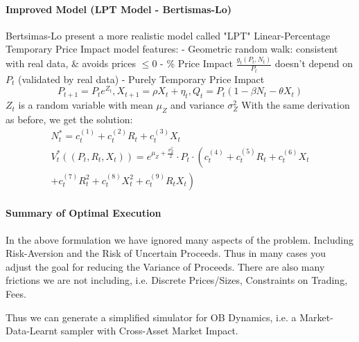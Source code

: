 \documentclass[11pt]{article}
\begin{document}
\paragraph*{Improved Model (LPT Model - Bertismas-Lo)}
Bertsimas-Lo present a more realistic model called "LPT" Linear-Percentage Temporary Price Impact model features:
- Geometric random walk: consistent with real data, \& avoids prices $\leq 0$
- \% Price Impact $\frac{g_t\left(P_t, N_t\right)}{P_t}$ doesn't depend on $P_t$ (validated by real data)
- Purely Temporary Price Impact
$$
P_{t+1}=P_t e^{Z_t}, X_{t+1}=\rho X_t+\eta_t, Q_t=P_t\left(1-\beta N_t-\theta X_t\right)
$$
$Z_t$ is a random variable with mean $\mu_Z$ and variance $\sigma_Z^2$
With the same derivation as before, we get the solution:
$$
\begin{gathered}
N_t^*=c_t^{(1)}+c_t^{(2)} R_t+c_t^{(3)} X_t \\
V_t^*\left(\left(P_t, R_t, X_t\right)\right)=e^{\mu_Z+\frac{\sigma_Z^2}{2}} \cdot P_t \cdot\left(c_t^{(4)}+c_t^{(5)} R_t+c_t^{(6)} X_t\right. \\
\left.+c_t^{(7)} R_t^2+c_t^{(8)} X_t^2+c_t^{(9)} R_t X_t\right)
\end{gathered}
$$

\paragraph*{Summary of Optimal Execution}
In the above formulation we have ignored many aspects of the problem. Including Risk-Aversion and the Risk of Uncertain Proceeds. Thus in many cases you adjust the goal for reducing the Variance of Proceeds. 
There are also many frictions we are not including, i.e. Discrete Prices/Sizes, Constraints on Trading, Fees.

Thus we can generate a simplified simulator for OB Dynamics, i.e. a Market-Data-Learnt sampler with Cross-Asset Market Impact. 
\end{document}
